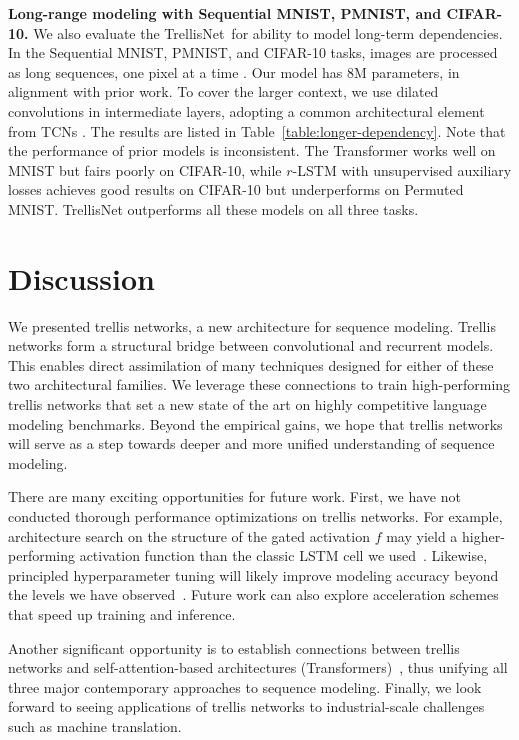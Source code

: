\documentclass{article} \usepackage{iclr2019_conference,times}
\newcommand\mypara[1]{\vspace{0mm}\noindent\textbf{#1}}
\newcommand{\model}{TrellisNet}
\begin{document}
\mypara{Long-range modeling with Sequential MNIST, PMNIST, and CIFAR-10.}
We also evaluate the \model~for ability to model long-term dependencies. In the Sequential MNIST, PMNIST, and CIFAR-10 tasks, images are processed as long sequences, one pixel at a time \citep{chang2017dilated,bai2018empirical,trinh2018learning}. Our model has 8M parameters, in alignment with prior work. To cover the larger context, we use dilated convolutions in intermediate layers, adopting a common architectural element from TCNs \citep{dilatedConv,waveNet,bai2018empirical}.
The results are listed in Table~\ref{table:longer-dependency}. Note that the performance of prior models is inconsistent. The Transformer works well on MNIST but fairs poorly on CIFAR-10, while $r$-LSTM with unsupervised auxiliary losses achieves good results on CIFAR-10 but underperforms on Permuted MNIST. TrellisNet outperforms all these models on all three tasks.


\section{Discussion}
\label{sec:discussion}

We presented trellis networks, a new architecture for sequence modeling. Trellis networks form a structural bridge between convolutional and recurrent models. This enables direct assimilation of many techniques designed for either of these two architectural families. We leverage these connections to train high-performing trellis networks that set a new state of the art on highly competitive language modeling benchmarks. Beyond the empirical gains, we hope that trellis networks will serve as a step towards deeper and more unified understanding of sequence modeling.

There are many exciting opportunities for future work. First, we have not conducted thorough performance optimizations on trellis networks. For example, architecture search on the structure of the gated activation $f$ may yield a higher-performing activation function than the classic LSTM cell we used~\citep{zoph2017neural,pham2018efficient}. Likewise, principled hyperparameter tuning will likely improve modeling accuracy beyond the levels we have observed~\citep{Melis2018}. Future work can also explore acceleration schemes that speed up training and inference.

Another significant opportunity is to establish connections between trellis networks and self-attention-based architectures (Transformers)~\citep{vaswani2017attention,santoro2018relational,chen2018best}, thus unifying all three major contemporary approaches to sequence modeling. Finally, we look forward to seeing applications of trellis networks to industrial-scale challenges such as machine translation.
\end{document}
